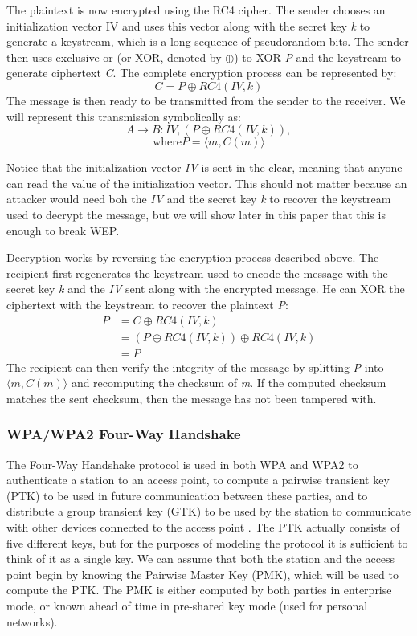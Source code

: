 \documentclass[11pt, twocolumn]{article} %
\begin{document}
The plaintext is now encrypted using the RC4 cipher.  The sender chooses an initialization vector IV and uses this vector along with the secret key \textit{k} to generate a keystream, which is a long sequence of pseudorandom bits.  The sender then uses exclusive-or (or XOR, denoted by $\oplus$) to XOR \textit{P} and the keystream to generate ciphertext \textit{C}.  The complete encryption process can be represented by: 
$$C = P \oplus RC4(IV, k)$$
The message is then ready to be transmitted from the sender to the receiver.  We will represent this transmission symbolically as:
$$A \rightarrow B: IV, (P \oplus RC4(IV, k)),$$
$$ \text{where} P = \langle m, C(m) \rangle$$ 

Notice that the initialization vector \textit{IV} is sent in the clear, meaning that anyone can read the value of the initialization vector.  This should not matter because an attacker would need boh the \textit{IV} and the secret key \textit{k} to recover the keystream used to decrypt the message, but we will show later in this paper that this is enough to break WEP.

Decryption works by reversing the encryption process described above.  The recipient first regenerates the keystream used to encode the message with the secret key \textit{k} and the \textit{IV} sent along with the encrypted message.  He can XOR the ciphertext with the keystream to recover the plaintext \textit{P}:
\begin{align*}
P &= C \oplus RC4(IV, k)\\
\nonumber &= (P \oplus RC4(IV, k)) \oplus RC4(IV, k)\\
\nonumber &= P
\end{align*}
The recipient can then verify the integrity of the message by splitting \textit{P} into $\langle m, C(m) \rangle$ and recomputing the checksum of \textit{m}.  If the computed checksum matches the sent checksum, then the message has not been tampered with.  

\subsubsection{WPA/WPA2 Four-Way Handshake}
The Four-Way Handshake protocol is used in both WPA and WPA2 to authenticate a station to an access point, to compute a pairwise transient key (PTK) to be used in future communication between these parties, and to distribute a group transient key (GTK) to be used by the station to communicate with other devices connected to the access point \cite{liu08}.  The PTK actually consists of five different keys, but for the purposes of modeling the protocol it is sufficient to think of it as a single key.  We can assume that both the station and the access point begin by knowing the Pairwise Master Key (PMK), which will be used to compute the PTK.  The PMK is either computed by both parties in enterprise mode, or known ahead of time in pre-shared key mode (used for personal networks).
\end{document}
